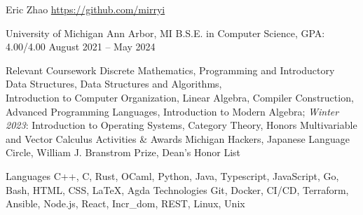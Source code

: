 \documentclass[letterpaper,11pt]{article}
\begin{document}
\rheading
  {Eric Zhao}
  {}
  {\href{https://github.com/mirryi}{https://github.com/mirryi}}
  {}

  \begin{rsectionlist}
    \rsectionitem%
      {University of Michigan}
      {Ann Arbor, MI}
      {B.S.E. in Computer Science, GPA: 4.00/4.00}
      {August 2021 -- May 2024}
      \begin{rpointlist}
        \rpoint
          {Relevant Coursework}
          {Discrete Mathematics, Programming and Introductory Data Structures, Data Structures and
            Algorithms, \\ Introduction to Computer Organization, Linear Algebra, Compiler
            Construction, Advanced Programming Languages, Introduction to Modern Algebra;
            \emph{Winter 2023}: Introduction to Operating Systems, Category Theory, Honors
            Multivariable and Vector Calculus}
        \rpoint
          {Activities \& Awards}
          {Michigan Hackers, Japanese Language Circle, William J. Branstrom Prize, Dean's Honor List}
      \end{rpointlist}
  \end{rsectionlist}

  \begin{rlinelist}
    \rline
      {Languages}
      {C++, C, Rust, OCaml, Python, Java, Typescript, JavaScript, Go, Bash, HTML, CSS, \LaTeX, Agda}
    \rline
      {Technologies}
      {Git, Docker, CI/CD, Terraform, Ansible, Node.js, React, Incr\_dom, REST, Linux, Unix}
  \end{rlinelist}
\end{document}
